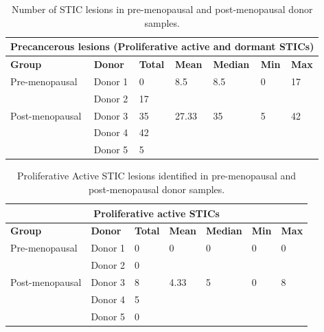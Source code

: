 \begin{refsection}
    \begin{table}[htbp]
        \centering
        \renewcommand{\arraystretch}{1.2}
        \caption{Number of STIC lesions in pre-menopausal and post-menopausal donor samples.}
        \label{chapter3_table_S2}
        \begin{tabularx}{\textwidth}{l l X X X X X}
            \toprule
            \multicolumn{7}{c}{\textbf{Precancerous lesions (Proliferative active and dormant STICs)}} \\
            \midrule
            \textbf{Group} & \textbf{Donor} & \textbf{Total} & \textbf{Mean} & \textbf{Median} & \textbf{Min} & \textbf{Max} \\
            \midrule
            Pre-menopausal & Donor 1 & 0 & 8.5 & 8.5 & 0 & 17 \\
            & Donor 2 & 17 &  &  &  &  \\
            Post-menopausal & Donor 3 & 35 & 27.33 & 35 & 5 & 42 \\
            & Donor 4 & 42 &  &  &  &  \\
            & Donor 5 & 5 &  &  &  &  \\
            \bottomrule
        \end{tabularx}
    \end{table}
    
    \begin{table}[htbp]
        \centering
        \renewcommand{\arraystretch}{1.2}
        \caption{Proliferative Active STIC lesions identified in pre-menopausal and post-menopausal donor samples.}
        \label{chapter3_table_S3}
        \begin{tabularx}{\textwidth}{l l X X X X X}
            \toprule
            \multicolumn{7}{c}{\textbf{Proliferative active STICs}} \\
            \midrule
            \textbf{Group} & \textbf{Donor} & \textbf{Total} & \textbf{Mean} & \textbf{Median} & \textbf{Min} & \textbf{Max} \\
            \midrule
            Pre-menopausal & Donor 1 & 0 & 0 & 0 & 0 & 0 \\
            & Donor 2 & 0 &  &  &  &  \\
            Post-menopausal & Donor 3 & 8 & 4.33 & 5 & 0 & 8 \\
            & Donor 4 & 5 &  &  &  &  \\
            & Donor 5 & 0 &  &  &  &  \\
            \bottomrule
        \end{tabularx}
    \end{table}
    

\end{refsection}
